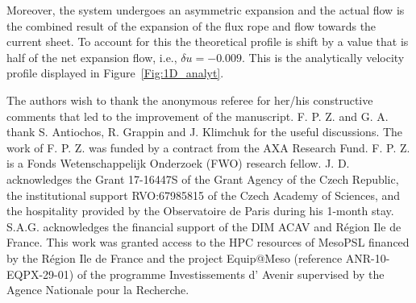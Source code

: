 \documentclass[apj]{emulateapj}
\begin{document}
Moreover, the system undergoes an asymmetric expansion and the actual flow is the combined result of the expansion of the flux rope and flow towards the current sheet. To account for this  the theoretical profile is shift by a value that is half of the net expansion flow, i.e., $\delta u =-0.009$. This is the analytically velocity profile displayed in Figure~\ref{Fig:1D_analyt}.



\begin{acknowledgements}

The authors wish to thank the  anonymous referee for her/his constructive comments that led to the improvement of the manuscript.  F. P. Z. and G. A.  thank S. Antiochos, R. Grappin and J. Klimchuk for the useful discussions. The work of F. P. Z. was funded by a contract from the AXA Research Fund. F. P. Z. is a Fonds Wetenschappelijk Onderzoek (FWO) research fellow. 
%
J. D. acknowledges the Grant 17-16447S of the Grant Agency of the Czech Republic, the institutional support RVO:67985815 of the Czech Academy of Sciences, and the hospitality provided by the Observatoire de Paris during his 1-month stay. 
%
S.A.G. acknowledges the financial support of the DIM ACAV and R\'{e}gion Ile de France. 
%
This work was granted access to the HPC resources of MesoPSL financed by the R\'{e}gion Ile de France and the project Equip@Meso (reference ANR-10-EQPX-29-01) of the programme Investissements d' Avenir supervised by the Agence Nationale pour la Recherche. 
%
%
\end{acknowledgements}



\end{document}

